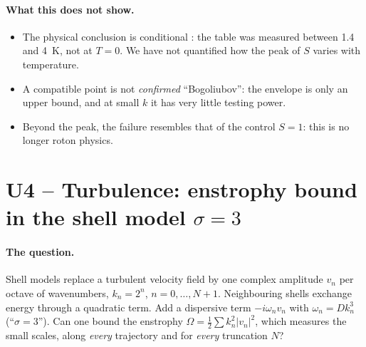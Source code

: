 \paragraph{What this does not show.}
\begin{itemize}
\item The physical conclusion is conditional \tierC{}: the table was measured between 1.4 and 4~K, not at
$T=0$. We have not quantified how the peak of $S$ varies with temperature.
\item A compatible point is not \emph{confirmed} ``Bogoliubov'': the envelope is only an upper
bound, and at small $k$ it has very little testing power.
\item Beyond the peak, the failure resembles that of the control $S=1$: this is no longer roton physics.
\end{itemize}

\section[U4 -- Turbulence: enstrophy bound]{U4 -- Turbulence: enstrophy bound in the shell model \texorpdfstring{$\sigma=3$}{sigma=3}}\label{ch5:U4}

\paragraph{The question.} Shell models replace a turbulent velocity field by one complex amplitude
$v_n$ per octave of wavenumbers, $k_n=2^n$, $n=0,\dots,N+1$. Neighbouring shells exchange energy through a
quadratic term. Add a dispersive term $-i\omega_nv_n$ with $\omega_n=Dk_n^3$ (``$\sigma=3$''). Can one
bound the enstrophy $\Omega=\tfrac12\sum k_n^2|v_n|^2$, which measures the small scales, along \emph{every}
trajectory and for \emph{every} truncation $N$?

